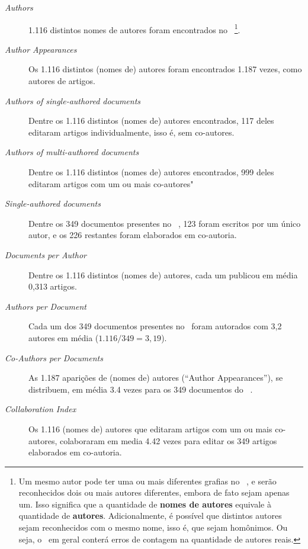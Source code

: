 \begin{description}
    \item [\textit{Authors}] 1.116 distintos nomes de autores foram encontrados no \dataset\  \footnote{Um mesmo autor pode ter uma ou mais diferentes grafias no \dataset\  , e serão reconhecidos dois ou mais autores diferentes, embora de fato sejam apenas um. Isso significa que a quantidade de \textbf{nomes de autores} equivale à quantidade de \textbf{autores}. Adicionalmente, é possível que distintos autores sejam reconhecidos com o mesmo nome, isso é, que sejam homônimos. Ou seja, o \dataset\   em geral conterá erros de contagem na quantidade de autores reais.}.
    \item [\textit{Author Appearances}] Os 1.116 distintos (nomes de) autores foram encontrados 1.187 vezes, como autores de artigos.
    \item [\textit{Authors of single-authored documents}] Dentre os 1.116 distintos (nomes de) autores encontrados, 117 deles editaram artigos individualmente, isso é, sem co-autores.
    \item [\textit{Authors of multi-authored documents}] Dentre os 1.116 distintos (nomes de) autores encontrados, 999 deles editaram artigos com um ou mais co-autores"
    \item [\textit{Single-authored documents}] Dentre os 349 documentos presentes no \dataset\  , 123 foram escritos por um único autor, e os 226 restantes foram elaborados em co-autoria.
    \item [\textit{Documents per Author}] Dentre os 1.116 distintos (nomes de) autores, cada um publicou em média 0,313 artigos.
    \item [\textit{Authors per Document}] Cada um dos 349 documentos presentes no \dataset\  foram autorados com 3,2 autores em média ($1.116 / 349 = 3,19$).
    \item [\textit{Co-Authors per Documents}] As 1.187 aparições de (nomes de) autores (``Author Appearances''), se distribuem, em média 3.4 vezes para os 349 documentos do \dataset\ .
    \item [\textit{Collaboration Index}] Os 1.116 (nomes de) autores que editaram artigos com um ou mais co-autores, colaboraram em media 4.42 vezes para editar os 349 artigos elaborados em co-autoria.
\end{description}